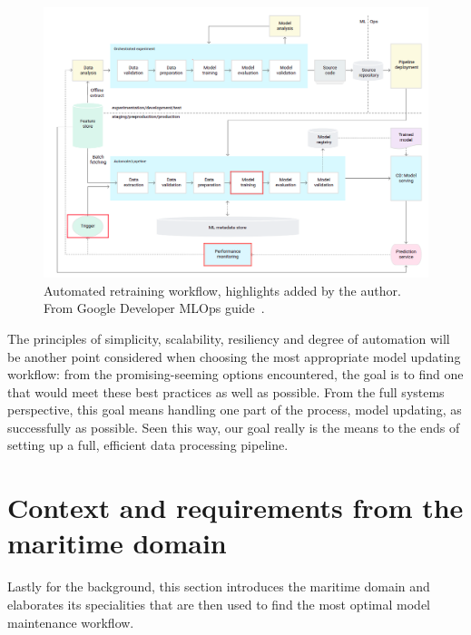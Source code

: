 \begin{figure}[ht]
\ \newline
\begin{center}
\includegraphics[width=1.0\columnwidth]{triggergooglemarked.png}
\caption{Automated retraining workflow, highlights added by the author. From Google Developer MLOps guide~\cite{googlemlops}.}
\label{triggerpipeline}
\end{center}
\end{figure}

The principles of simplicity, scalability, resiliency and degree of automation will be another point considered when choosing the most appropriate model updating workflow: from the promising-seeming options encountered, the goal is to find one that would meet these best practices as well as possible. From the full systems perspective, this goal means handling one part of the process, model updating, as successfully as possible. Seen this way, our goal really is the means to the ends of setting up a full, efficient data processing pipeline.

\section{Context and requirements from the maritime domain}

Lastly for the background, this section introduces the maritime domain and elaborates its specialities that are then used to find the most optimal model maintenance workflow.

